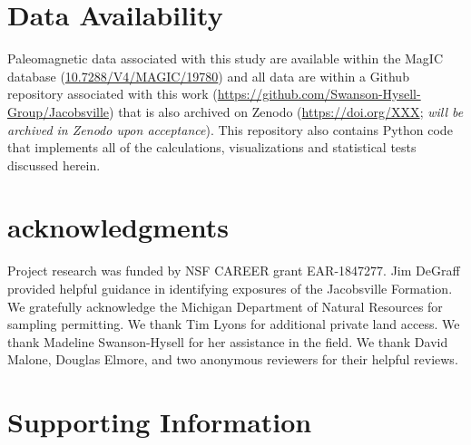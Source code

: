 \section*{Data Availability}
Paleomagnetic data associated with this study are available within the MagIC database (\url{10.7288/V4/MAGIC/19780}) and all data are within a Github repository associated with this work (\url{https://github.com/Swanson-Hysell-Group/Jacobsville}) that is also archived on Zenodo (\url{https://doi.org/XXX}; \textit{will be archived in Zenodo upon acceptance}). This repository also contains Python code that implements all of the calculations, visualizations and statistical tests discussed herein. 

\section*{acknowledgments}
Project research was funded by NSF CAREER grant EAR-1847277. Jim DeGraff provided helpful guidance in identifying exposures of the Jacobsville Formation. We gratefully acknowledge the Michigan Department of Natural Resources for sampling permitting. We thank Tim Lyons for additional private land access. We thank Madeline Swanson-Hysell for her assistance in the field. We thank David Malone, Douglas Elmore, and two anonymous reviewers for their helpful reviews. 

\section{Supporting Information}
